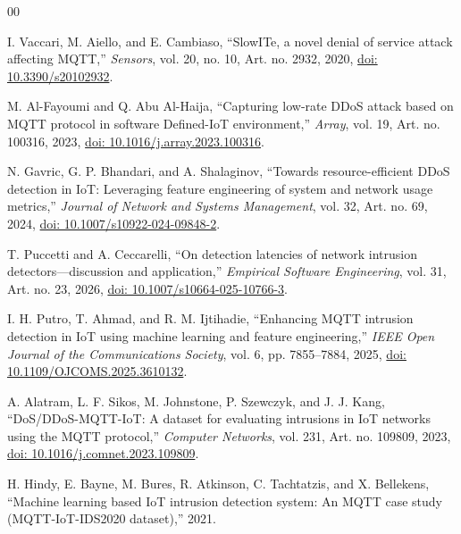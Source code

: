 \documentclass[conference]{IEEEtran}
\begin{document}
\begin{thebibliography}{00}

I. Vaccari, M. Aiello, and E. Cambiaso,
``SlowITe, a novel denial of service attack affecting MQTT,''
\emph{Sensors}, vol. 20, no. 10, Art. no. 2932, 2020,
\href{https://doi.org/10.3390/s20102932}{doi: 10.3390/s20102932}.

M. Al-Fayoumi and Q. Abu Al-Haija,
``Capturing low-rate DDoS attack based on MQTT protocol in software
Defined-IoT environment,'' \emph{Array}, vol. 19, Art. no. 100316,
2023, \href{https://doi.org/10.1016/j.array.2023.100316}{doi: 10.1016/j.array.2023.100316}.

N. Gavric, G. P. Bhandari, and A. Shalaginov,
``Towards resource-efficient DDoS detection in IoT: Leveraging feature
engineering of system and network usage metrics,''
\emph{Journal of Network and Systems Management}, vol. 32,
Art. no. 69, 2024, \href{https://doi.org/10.1007/s10922-024-09848-2}{doi: 10.1007/s10922-024-09848-2}.

T. Puccetti and A. Ceccarelli,
``On detection latencies of network intrusion detectors---discussion
and application,'' \emph{Empirical Software Engineering}, vol. 31,
Art. no. 23, 2026, \href{https://doi.org/10.1007/s10664-025-10766-3}{doi: 10.1007/s10664-025-10766-3}.

I. H. Putro, T. Ahmad, and R. M. Ijtihadie,
``Enhancing MQTT intrusion detection in IoT using machine learning
and feature engineering,'' \emph{IEEE Open Journal of the
Communications Society}, vol. 6, pp. 7855--7884, 2025,
\href{https://doi.org/10.1109/OJCOMS.2025.3610132}{doi: 10.1109/OJCOMS.2025.3610132}.

A. Alatram, L. F. Sikos, M. Johnstone, P. Szewczyk, and J. J. Kang,
``DoS/DDoS-MQTT-IoT: A dataset for evaluating intrusions in IoT
networks using the MQTT protocol,'' \emph{Computer Networks},
vol. 231, Art. no. 109809, 2023, \href{https://doi.org/10.1016/j.comnet.2023.109809}{doi: 10.1016/j.comnet.2023.109809}.

H. Hindy, E. Bayne, M. Bures, R. Atkinson, C. Tachtatzis, and
X. Bellekens,
``Machine learning based IoT intrusion detection system: An MQTT case
study (MQTT-IoT-IDS2020 dataset),''
2021.


\end{thebibliography}
\end{document}
